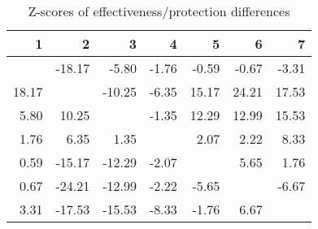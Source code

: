 \begin{table}[ht]
\centering
\begin{tabular}{rrrrrrr}
  \hline
1 & 2 & 3 & 4 & 5 & 6 & 7 \\ 
  \hline
 & -18.17 & -5.80 & -1.76 & -0.59 & -0.67 & -3.31 \\ 
  18.17 &  & -10.25 & -6.35 & 15.17 & 24.21 & 17.53 \\ 
  5.80 & 10.25 &  & -1.35 & 12.29 & 12.99 & 15.53 \\ 
  1.76 & 6.35 & 1.35 &  & 2.07 & 2.22 & 8.33 \\ 
  0.59 & -15.17 & -12.29 & -2.07 &  & 5.65 & 1.76 \\ 
  0.67 & -24.21 & -12.99 & -2.22 & -5.65 &  & -6.67 \\ 
  3.31 & -17.53 & -15.53 & -8.33 & -1.76 & 6.67 &  \\ 
   \hline
\end{tabular}
\caption{Z-scores of effectiveness/protection differences} 
\end{table}
